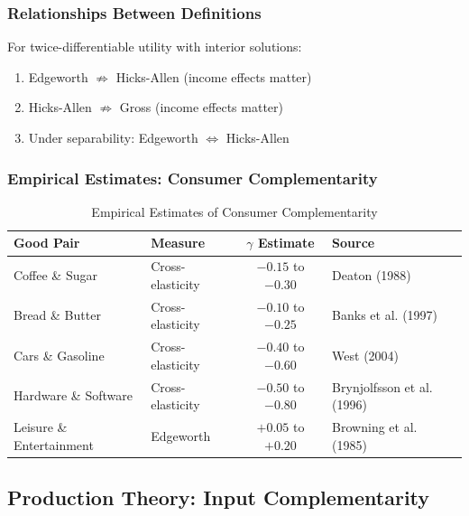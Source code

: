 \subsubsection{Relationships Between Definitions}

\begin{theorem}
For twice-differentiable utility with interior solutions:
\begin{enumerate}
    \item Edgeworth $\not\Rightarrow$ Hicks-Allen (income effects matter)
    \item Hicks-Allen $\not\Rightarrow$ Gross (income effects matter)
    \item Under separability: Edgeworth $\Leftrightarrow$ Hicks-Allen
\end{enumerate}
\end{theorem}

\subsubsection{Empirical Estimates: Consumer Complementarity}

\begin{table}[h]
\centering
\caption{Empirical Estimates of Consumer Complementarity}
\label{tab:consumer-gamma}
\renewcommand{\arraystretch}{1.2}
\small
\begin{tabular}{@{}llcl@{}}
\toprule
\textbf{Good Pair} & \textbf{Measure} & \textbf{$\gamma$ Estimate} & \textbf{Source} \\
\midrule
Coffee \& Sugar & Cross-elasticity & $-0.15$ to $-0.30$ & Deaton (1988) \\
Bread \& Butter & Cross-elasticity & $-0.10$ to $-0.25$ & Banks et al. (1997) \\
Cars \& Gasoline & Cross-elasticity & $-0.40$ to $-0.60$ & West (2004) \\
Hardware \& Software & Cross-elasticity & $-0.50$ to $-0.80$ & Brynjolfsson et al. (1996) \\
Leisure \& Entertainment & Edgeworth & $+0.05$ to $+0.20$ & Browning et al. (1985) \\
\bottomrule
\end{tabular}
\end{table}

\subsection{Production Theory: Input Complementarity}

